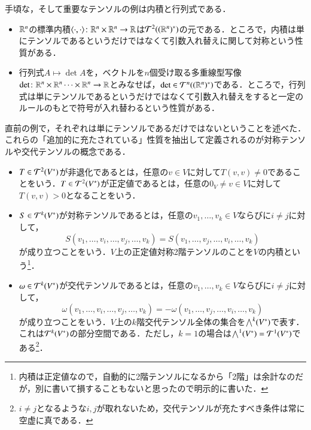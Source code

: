 \begin{exm}手頃な，そして重要なテンソルの例は内積と行列式である．
\begin{itemize}
\item $\mathbb{R}^n$の標準内積$\langle \cdot, \cdot \rangle \colon \mathbb{R}^n \times \mathbb{R}^n \to \mathbb{R}$は$\mathcal{T}^2((\mathbb{R}^n)^*)$の元である．ところで，内積は単にテンソルであるというだけではなくて引数入れ替えに関して対称という性質がある．
\item 行列式$A \mapsto \det A$を，ベクトルを$n$個受け取る多重線型写像$\det \colon \mathbb{R}^n \times \mathbb{R}^n \dots \times \mathbb{R}^n \to \mathbb{R}$とみなせば，$\det \in \mathcal{T}^n((\mathbb{R}^n)^*)$である．ところで，行列式は単にテンソルであるというだけではなくて引数入れ替えをすると一定のルールのもとで符号が入れ替わるという性質がある．
\end{itemize}
\end{exm}

直前の例で，それぞれは単にテンソルであるだけではないということを述べた．これらの「追加的に充たされている」性質を抽出して定義されるのが対称テンソルや交代テンソルの概念である．

\begin{defi}
\leavevmode
\begin{itemize}
\item $T \in \mathcal{T}^2(V^*)$が非退化であるとは，任意の$v \in V$に対して$T(v,v) \neq 0$であることをいう．$T \in \mathcal{T}^2(V^*)$が正定値であるとは，任意の$0_V \neq v \in V$に対して$T(v,v) > 0$となることをいう．
\item $S \in \mathcal{T}^k(V^*)$が対称テンソルであるとは，任意の$v_1, \dots, v_k \in V$ならびに$i \neq j$に対して，
\begin{equation}
S(v_1,\dots, v_i, \dots, v_j, \dots, v_k) = S(v_1, \dots, v_j, \dots, v_i, \dots, v_k)
\end{equation}
が成り立つことをいう．$V$上の正定値対称2階テンソルのことを$V$の内積という\footnote{内積は正定値なので，自動的に2階テンソルになるから「2階」は余計なのだが，別に書いて損することもないと思ったので明示的に書いた．}．
\item $\omega \in \mathcal{T}^k(V^*)$が交代テンソルであるとは，任意の$v_1, \dots, v_k \in V$ならびに$i \neq j$に対して，
\begin{equation}
\omega(v_1,\dots, v_i, \dots, v_j, \dots, v_k) = -\omega(v_1, \dots, v_j, \dots, v_i, \dots, v_k)
\end{equation}
が成り立つことをいう．$V$上の$k$階交代テンソル全体の集合を$\bigwedge^k(V^*)$で表す．これは$\mathcal{T}^k(V^*)$の部分空間である．ただし，$k=1$の場合は$\bigwedge^1(V^*) = \mathcal{T}^1(V^*)$である\footnote{$i \neq j$となるような$i,j$が取れないため，交代テンソルが充たすべき条件は常に空虚に真である．}．
\end{itemize}
\end{defi}

